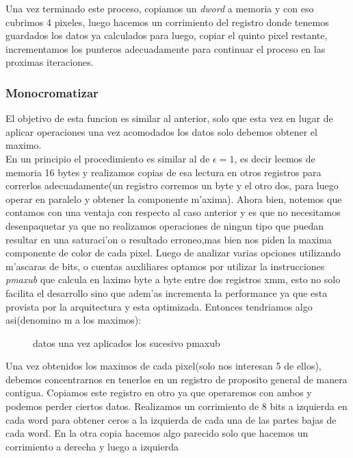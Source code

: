 Una vez terminado este proceso, copiamos un \textit{dword} a memoria y con eso cubrimos 4 pixeles,
luego hacemos un corrimiento del registro donde tenemos guardados los datos ya calculados para luego,
copiar el quinto pixel restante, incrementamos los punteros adecuadamente para continuar el 
proceso en las proximas iteraciones.\\


\subsubsection{Monocromatizar \protect{$\epsilon = \infty $} }
El objetivo de esta funcion es similar al anterior, solo que esta vez en lugar de aplicar operaciones
una vez acomodados los datos solo debemos obtener el maximo.\\
En un principio el procedimiento es similar al de  $\epsilon= 1$, es decir leemos de memoria 16 bytes
y realizamos copias de esa lectura en otros registros para correrlos adecuadamente(un registro corremos un byte 
 y el otro dos, para luego operar en paralelo y obtener la componente m'axima).  Ahora bien, 
notemos que contamos con una ventaja con respecto al caso anterior y es que no necesitamos desenpaquetar
ya que no realizamos operaciones de ningun tipo que puedan resultar en una saturaci'on o 
resultado erroneo,mas bien nos piden la maxima componente de color de cada pixel. Luego de analizar 
varias opciones utilizando m'ascaras de bits, o cuentas auxliliares optamos por utilizar la instrucciones
\textit{pmaxub} que calcula en laximo byte a byte entre dos registros xmm, esto no solo facilita 
el desarrollo sino que adem'as incrementa la performance ya que esta provista por la arquitectura y 
esta optimizada. Entonces tendriamos algo asi(denomino m a los maximos):\\
\begin{figure}[hb]
\caption{datos una vez aplicados los sucesivo pmaxub}
\label{est:m-uno}
\end{figure}
Una vez obtenidos los maximos de cada pixel(solo nos interesan 5 de ellos), debemos concentrarnos en
tenerlos en un registro de proposito general de manera contigua. 
Copiamos este registro en otro ya que operaremos con ambos y podemos perder ciertos datos. Realizamos un 
corrimiento de 8 bits a izquierda en cada word para obtener ceros a la izquierda de cada una de las partes bajas de
cada word. En la otra copia hacemos algo parecido solo que hacemos un corrimiento a derecha y luego a izquierda
